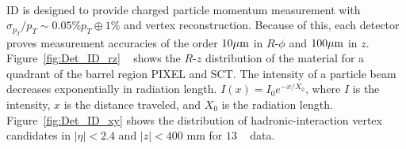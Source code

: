 \paragraph{}
ID is designed to provide charged particle momentum measurement with $\sigma_{p_{T}}/p_{T} \sim 0.05\% p_{T} \oplus 1\%$ and vertex reconstruction.
Because of this, each detector proves measurement accuracies of the order $10 \mu\rm m$ in $R$-$\phi$ and $100 \mu\rm m$ in $z$.
Figure~\ref{fig:Det_ID_rz} ~\cite{Aaboud:2017pjd} shows the $R$-$z$ distribution of the material for a quadrant of the barrel region PIXEL and SCT. The intensity of a particle beam decreases exponentially in radiation length. $I(x) = I_0 e^{-x/X_0}$, where $I$ is the intensity, $x$ is the distance traveled, and $X_0$ is the radiation length. Figure~\ref{fig:Det_ID_xy} shows the distribution of hadronic-interaction vertex candidates in $|\eta|<2.4$ and $|z|<400$ mm for $13$ \TeV~ data. 

